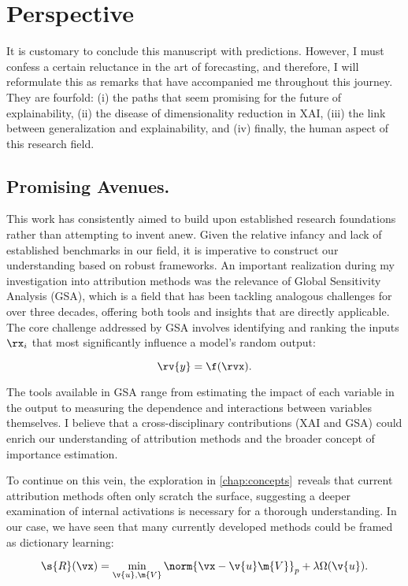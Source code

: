 \section{Perspective}

It is customary to conclude this manuscript with predictions. However, I must confess a certain reluctance in the art of forecasting, and therefore, I will reformulate this as remarks that have accompanied me throughout this journey. They are fourfold: (i) the paths that seem promising for the future of explainability, (ii) the disease of dimensionality reduction in XAI, (iii) the link between generalization and explainability, and (iv) finally, the human aspect of this research field.

\subsection{Promising Avenues.} 
This work has consistently aimed to build upon established research foundations rather than attempting to invent anew. Given the relative infancy and lack of established benchmarks in our field, it is imperative to construct our understanding based on robust frameworks. An important realization during my investigation into attribution methods was the relevance of Global Sensitivity Analysis (GSA), which is a field that has been tackling analogous challenges for over three decades, offering both tools and insights that are directly applicable. The core challenge addressed by GSA involves identifying and ranking the inputs $\rx_i$ that most significantly influence a model's random output:


$$
\rv{y} = \f(\rvx).
$$

The tools available in GSA range from estimating the impact of each variable in the output to measuring the dependence and interactions between variables themselves. I believe that a cross-disciplinary contributions (XAI and GSA) could enrich our understanding of attribution methods and the broader concept of importance estimation.

To continue on this vein, the exploration in \autoref{chap:concepts}~reveals that current attribution methods often only scratch the surface, suggesting a deeper examination of internal activations is necessary for a thorough understanding. In our case, we have seen that many currently developed methods could be framed as dictionary learning:

$$
\s{R}(\vx) = \min_{\v{u},\m{V}} \norm{ \vx - \v{u}\m{V} }_p + \lambda \Omega(\v{u}).
$$

